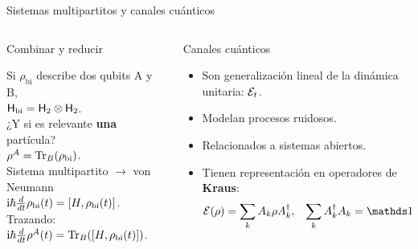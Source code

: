 \begin{frame}{Sistemas multipartitos y canales cuánticos}
    \begin{columns}
        \begin{column}{0.5\textwidth}
            \begin{block}{Combinar y reducir}
                \begin{center}
            Si $\rho_{\text{bi}}$ describe dos qubits A y B,\pause \\
            ${\sf H}_{\text{bi}}={\sf H}_{2}\otimes{\sf H}_{2}$. \pause \\
            \vspace{0.2cm}
           ¿Y si es relevante \textbf{una} partícula?\pause \\
            $\rho^{A}=\Tr_{B}(\rho_{\text{bi}})$. \pause \\
            \vspace{0.2cm} 
            Sistema multipartito $\rightarrow$ von Neumann\\
            $\text{i}\hbar\frac{d}{d t} \rho_{\text{bi}}(t)=[H,\rho_{\text{bi}}(t)]$. \pause \\
            \vspace{0.2cm}
            Trazando:\\
            $\text{i}\hbar\frac{d}{d t} \rho^{A}(t)=\Tr_{B}([H,\rho_{\text{bi}}(t)])$.\pause \\
                \end{center}
            \end{block}
        \end{column}
        \pause
        \begin{column}{0.5\textwidth}
        \begin{block}{Canales cuánticos}
            \begin{itemize}
                \item Son generalización lineal de la dinámica unitaria: $\mathcal{E}_{t}$.
                \item Modelan procesos ruidosos.
                \item Relacionados a sistemas abiertos.
                \item Tienen representación en operadores de \textbf{Kraus}:
                    \begin{align}
                        \mcE(\rho)=\sum_{k}A_{k}\rho A^{\dagger}_{k},& &\sum_{k}A_{k}^{\dagger}A_{k}=\Id \nonumber
                    \end{align}
            \end{itemize}
        \end{block}
        \end{column}
    \end{columns}
\end{frame}



